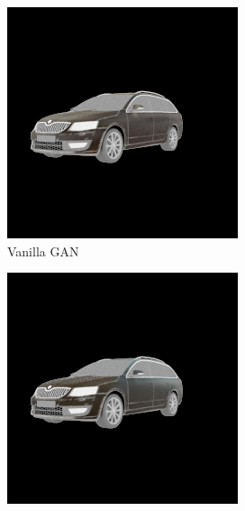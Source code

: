\begin{figure}
    \centering
    \caption{Different GAN loss functions produce different results when training our model. From
        left to right, we show our results for vanilla GAN, WGAN w/ gradient penalty, and LSGAN.
        The LSGAN model falls into \emph{mode collapse}.}
    \label{fig:gan-results}
    \vspace{0.2in}
    \begin{subfigure}[t]{0.3\linewidth}
        \centering
       \includegraphics[width=\linewidth]{graphics/gan_vanilla.png}
        \caption{Vanilla GAN}
    \end{subfigure}
    \begin{subfigure}[t]{0.3\linewidth}
        \centering
      \includegraphics[width=\linewidth]{graphics/gan_wgangp.png}

\end{subfigure}
\end{figure}
